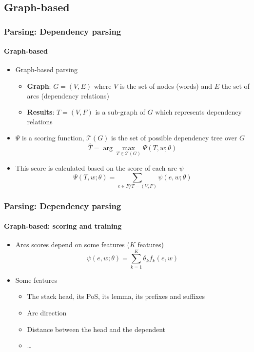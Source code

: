 \documentclass[xcolor=table]{beamer}
\begin{document}
\subsection{Graph-based}

\begin{frame}
\frametitle{Parsing: Dependency parsing}
\framesubtitle{Graph-based}

\begin{minipage}{.6\textwidth}
	\begin{itemize}
		\item Graph-based parsing
		\begin{itemize}
			\item \textbf{Graph}: $G = (V, E)$ where $V$ is the set of nodes (words) and $E$ the set of arcs (dependency relations)
			\item \textbf{Results}: $T = (V, F)$ is a sub-graph of $G$ which represents dependency relations
		\end{itemize}
	\end{itemize}
\end{minipage}
\begin{minipage}{.38\textwidth}
\end{minipage}

\begin{itemize}
	\item $\Psi$ is a scoring function, $ \mathcal{T}(G) $ is the set of possible dependency tree over $G$
	\[ \hat{T} = \arg\max\limits_{T \in \mathcal{T}(G)} \Psi(T, w; \theta) \]
	\item This score is calculated based on the score of each arc $\psi$
	\[ \Psi(T, w; \theta) = \sum_{e \in F / T = (V, F)} \psi(e, w; \theta) \]
\end{itemize}

\end{frame}

\begin{frame}
\frametitle{Parsing: Dependency parsing}
\framesubtitle{Graph-based: scoring and training}

\begin{itemize}
	\item Arcs scores depend on some features ($K$ features)
	\[ \psi(e, w; \theta) = \sum_{k = 1}^{K} \theta_k f_k(e, w)  \]
	
	\item Some features
	\begin{itemize}
		\item The stack head, its PoS, its lemma, its prefixes and suffixes
		\item Arc direction
		\item Distance between the head and the dependent
		\item \ldots
	\end{itemize}
	
\end{itemize}

\end{frame}
\end{document}
